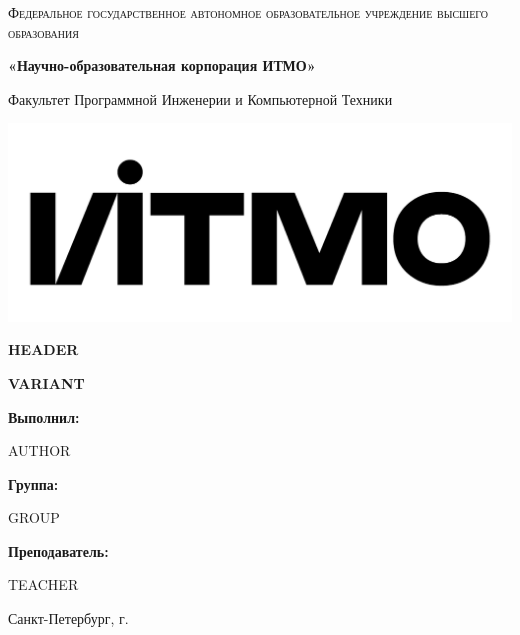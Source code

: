 \documentclass[12pt,a4paper]{report}
\begin{document}
\begin{titlepage} 
	\centering
	{
        \scshape
        Федеральное государственное автономное образовательное учреждение высшего образования
        \par
        \textbf{«Научно-образовательная корпорация ИТМО»}
        \par
        \vspace*{1cm}
        Факультет Программной Инженерии и Компьютерной Техники
        \par
    }
    \vspace*{0.6cm}
    \includegraphics[width=\textwidth]{logo.png}
    {
        \Large
        \textbf{HEADER}
        \par
        \normalsize
        \vspace*{0.75cm}
        \textbf{VARIANT}
        \par
    }
    \vfill
    \hfill\begin{minipage}{\dimexpr\textwidth-7.8cm}
        \textbf{Выполнил:}\par
        AUTHOR\par
        \vspace*{0.15cm}
        \textbf{Группа:}\par
        GROUP\par
        \vspace*{0.15cm}
        \textbf{Преподаватель:}\par
        TEACHER\par
    \end{minipage}
    \vfill
    Санкт-Петербург, \the\year{}г.
\end{titlepage}  
\end{document}
